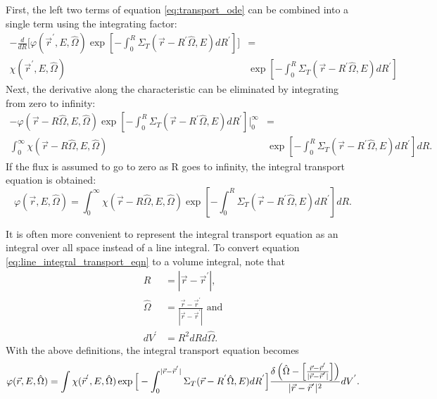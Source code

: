 First, the left two terms of equation \ref{eq:transport_ode} can be combined 
into a single term using the integrating factor:
\begin{align}
  -\frac{d}{dR}\bigg[\varphi(\vec{r}^{'},E,\hat{\Omega})
      \exp{\left[-\int_0^R \Sigma_T(\vec{r}-R^{'}\hat{\Omega},E)dR^{'}\right]
      \bigg]} & = \nonumber \\
  \chi(\vec{r}^{'},E,\hat{\Omega})
  &\exp{\left[-\int_0^R \Sigma_T(\vec{r}-R^{'}\hat{\Omega},E)dR^{'} \right]}
  \nonumber
\end{align}
Next, the derivative along the characteristic can be eliminated by integrating 
from zero to infinity:
\begin{align}
    -\varphi(\vec{r} - R\hat{\Omega},E,\hat{\Omega})
    \exp{\left[-\int_0^R \Sigma_T(\vec{r}-R^{'}\hat{\Omega},E)dR^{'}\right]}
    \bigg|_0^{\infty} & = \nonumber \\
    \int_0^{\infty} 
    \chi(\vec{r} - R\hat{\Omega},E,\hat{\Omega})
    &\exp{\left[-\int_0^R \Sigma_T(\vec{r}-R^{'}\hat{\Omega},E)dR^{'} \right]} dR.
    \nonumber
\end{align}
If the flux is assumed to go to zero as R goes to infinity, the integral 
transport equation is obtained:
\begin{equation}
    \varphi(\vec{r},E,\hat{\Omega}) = 
    \int_0^{\infty} \chi(\vec{r} - R\hat{\Omega},E,\hat{\Omega})
    \exp{\left[-\int_0^R \Sigma_T(\vec{r}-R^{'}\hat{\Omega},E)dR^{'} \right]} dR.
  \label{eq:line_integral_transport_eqn}
\end{equation}

It is often more convenient to represent the integral transport equation as an 
integral over all space instead of a line integral. To convert equation 
\ref{eq:line_integral_transport_eqn} to a volume integral, note that
\begin{align} 
  R & = |\vec{r} - \vec{r}^{'}| \text{,} \nonumber \\
  \hat{\Omega} & = \frac{\vec{r} - \vec{r}^{'}}{|\vec{r} - \vec{r}^{'}|} 
  \text{ and} \nonumber \\
  dV^{'} & = R^2dRd\hat{\Omega}.
\end{align}
With the above definitions, the integral transport equation becomes
\begin{equation*}
  \varphi(\vec{r},E,\hat{\Omega}) = 
  \int \chi(\vec{r}^{'},E,\hat{\Omega})
  \exp{\Big[-\int_0^{|\vec{r} - \vec{r}^{'}|} 
      \Sigma_T(\vec{r}-R^{'}\hat{\Omega},E)dR^{'} \Big]} \\
  \frac{\delta \left(\hat{\Omega} - \left[\frac{\vec{r} - \vec{r}^{'}}
      {|\vec{r} - \vec{r}^{'}|}\right]\right)}
        {|\vec{r} - \vec{r}^{'}|^2} dV^{'}.
\end{equation*}

